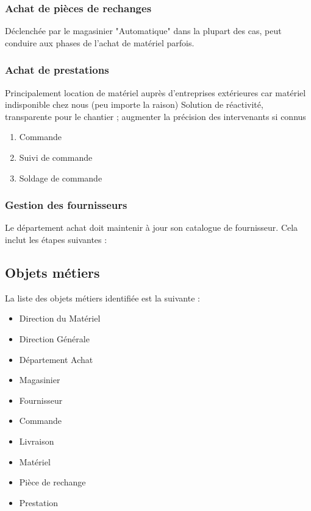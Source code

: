 \documentclass[a4paper]{article}
\begin{document}
\subsubsection{Achat de pièces de rechanges}

Déclenchée par le magasinier
"Automatique" dans la plupart des cas, peut conduire aux phases de l'achat
de matériel parfois.


\subsubsection{Achat de prestations}

Principalement location de matériel auprès d'entreprises extérieures car
matériel indisponible chez nous (peu importe la raison)
Solution de réactivité, transparente pour le chantier ; augmenter la
précision des intervenants si connus

\begin{enumerate}
\item Commande 
\item Suivi de commande
\item Soldage de commande
\end{enumerate}

\subsubsection{Gestion des fournisseurs}

Le département achat doit maintenir à jour son catalogue de fournisseur.
Cela inclut les étapes suivantes :
\begin{enumerate}
\end{enumerate}

\subsection{Objets métiers}

La liste des objets métiers identifiée est la suivante :

\begin{itemize}
\item Direction du Matériel
\item Direction Générale
\item Département Achat
\item Magasinier
\item Fournisseur
\item Commande
\item Livraison
\item Matériel
\item Pièce de rechange
\item Prestation
\end{itemize}
\end{document}
